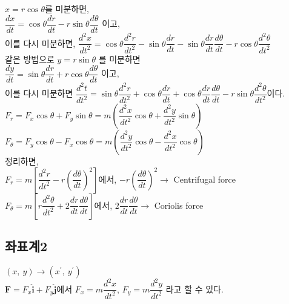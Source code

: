 $ x = r \cos \theta $를 미분하면, \\
$\dfrac{dx}{dt} = \cos \theta \dfrac{dr}{dt} - r \sin \theta \dfrac{d\theta}{dt}$ 이고, \\
이를 다시 미분하면, 
$\dfrac{d^{2}x}{dt^{2}} = \cos \theta \dfrac{d^{2}r}{dt^{2}} - \sin \theta \dfrac{dr}{dt} - \sin \theta \dfrac{dr}{dt} \dfrac{d\theta}{dt} -r \cos \theta \dfrac{d^{2}\theta}{dt^{2}}$\\
같은 방법으로 $ y = r \sin \theta $ 를 미분하면 \\
$\dfrac{dy}{dt} = \sin \theta \dfrac{dr}{dt} + r \cos \theta \dfrac{d\theta}{dt}$ 이고,\\
이를 다시 미분하면
$\dfrac{d^{2}t}{dt^{2}} = \sin \theta \dfrac{d^{2}r}{dt^{2}} + \cos \theta \dfrac{dr}{dt} + \cos \theta \dfrac{dr}{dt} \dfrac{d\theta}{dt} -r \sin \theta \dfrac{d^{2}\theta}{dt^{2}}$이다. \\



$ F_{r} = F_{x} \cos \theta + F_{y} \sin \theta 
= m \left ( \dfrac{d^{2}x}{dt^{2}} \cos \theta + \dfrac{d^{2}y}{dt^{2}} \sin \theta \right) $\\

$ F_{\theta} = F_{y} \cos \theta - F_{x} \cos \theta 
= m \left ( \dfrac{d^{2}y}{dt^{2}} \cos \theta - \dfrac{d^{2}x}{dt^{2}} \cos \theta \right) $\\


정리하면, \\

$ F_{r} = m \left[ \dfrac{d^{2}r}{dt^{2}} - r \left( {\dfrac{d \theta}{dt}} \right)^{2} \right] $에서, 
$ -r \left( {\dfrac{d \theta}{dt}} \right)^{2} \rightarrow $ Centrifugal force \\

$ F_{\theta} = m \left[ r \dfrac{d^{2}\theta}{dt^{2}} + 2 \dfrac{dr}{dt} \dfrac{d\theta}{dt}  \right] $에서, 
$ 2 \dfrac{dr}{dt} \dfrac{d\theta}{dt} \rightarrow $ Coriolis force \\


\subsection{좌표계2}

$ (x,~y) 	\rightarrow (x^{\prime},~y^{\prime})$\\

$ \mathbf {F} = F_{x} \mathbf{\hat{i}} + F_{y} \mathbf{\hat{j}} $에서 
$ F_{x} = m \dfrac{d^{2}x}{dt^{2}}$, 
$ F_{y} = m \dfrac{d^{2}y}{dt^{2}}$ 라고 할 수 있다.\\

